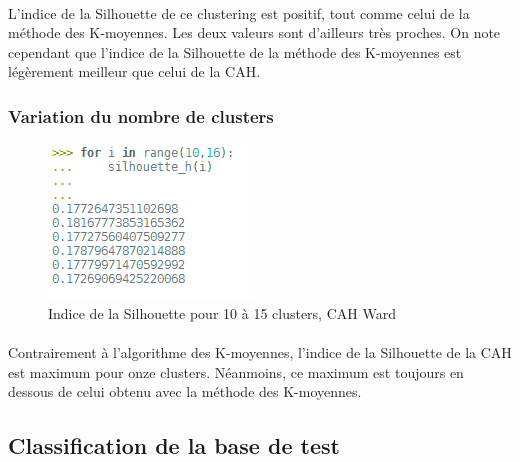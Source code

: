 \documentclass{article}
\begin{document}
        \paragraph{}L'indice de la Silhouette de ce clustering est positif, tout comme celui de la méthode des K-moyennes. Les deux valeurs sont d'ailleurs très proches. On note cependant que l'indice de la Silhouette de la méthode des K-moyennes est légèrement meilleur que celui de la CAH.
        \subsubsection{Variation du nombre de clusters}
        \begin{figure}[H]
            \centering
            \includegraphics{silhouette_h(10_15).PNG}
            \caption{Indice de la Silhouette pour 10 à 15 clusters, CAH Ward}
        \end{figure}
        \paragraph{}Contrairement à l'algorithme des K-moyennes, l'indice de la Silhouette de la CAH est maximum pour onze clusters. Néanmoins, ce maximum est toujours en dessous de celui obtenu avec la méthode des K-moyennes.
    \subsection{Classification de la base de test}
\end{document}
